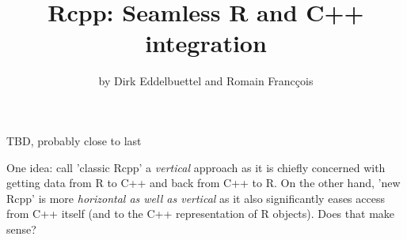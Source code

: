 
\title{Rcpp: Seamless R and C++ integration}
\author{by Dirk Eddelbuettel and Romain Franc\c{c}ois}

\maketitle



TBD, probably close to last

One idea: call 'classic Rcpp' a \textsl{vertical} approach as it is chiefly
concerned with getting data from R to C++ and back from C++ to R. On the
other hand, 'new Rcpp' is more \textsl{horizontal as well as vertical} as it
also significantly eases access from C++ itself (and to the C++
representation of R objects).  Does that make sense?



